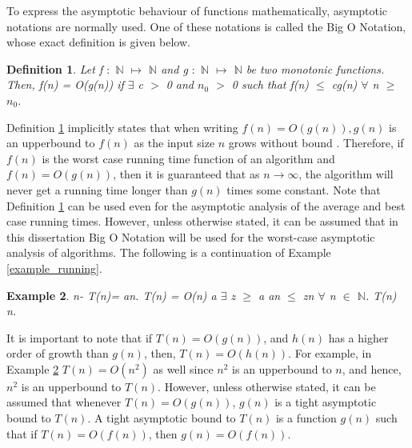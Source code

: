\documentclass[12pt]{article}
\newtheorem{definition}{Definition}[subsection]
\newtheorem{example}[definition]{Example}
\numberwithin{equation}{subsection}
\numberwithin{table}{subsection}
\numberwithin{algorithm}{subsection}
\numberwithin{figure}{subsection}
\begin{document}
To express the asymptotic behaviour of functions mathematically, asymptotic notations are normally used. One of these notations is called the Big O Notation, whose exact definition is given below.
\begin{definition}
\label{bigonotation}
Let f $:$ $\mathbb{N}$ $\mapsto$ $\mathbb{N}$ and g $:$ $\mathbb{N}$ $\mapsto$ $\mathbb{N}$ be two monotonic functions. Then, f(n) = O(g(n)) if $\exists$ c $>$ 0 and $n_0$ $>$ 0 such that f(n) $\leq$ cg(n) $\forall$ n $\geq$ $n_0$.  
\end{definition}
Definition \ref{bigonotation} implicitly states that when writing $\mathit{f(n) = O(g(n)), g(n)}$ is an upperbound to $\mathit{f(n)}$ as the input size $\mathit{n}$ grows without bound \cite{adamchik_2009}. Therefore, if $\mathit{f(n)}$ is the worst case running time function of an algorithm and $\mathit{f(n) = O(g(n))}$, then it is guaranteed that as $\mathit{n \rightarrow \infty}$, the algorithm will never get a running time longer than $\mathit{g(n)}$ times some constant. Note that Definition \ref{bigonotation} can be used even for the asymptotic analysis of the average and best case running times. However, unless otherwise stated, it can be assumed that in this dissertation Big O Notation will be used for the worst-case asymptotic analysis of algorithms. The following is a continuation of Example \ref{example_running}.
\begin{example}
\label{bigonotationexample}
{} n-{} T(n)= an. {} T(n) = O(n) {} a  {} $\exists$ z $\geq$ a {} an $\leq$ zn $\forall$ n $\in$ $\mathbb{N}$. {} T(n) {} n.
\end{example}
It is important to note that if $\mathit{T(n) = O(g(n))}$, and $\mathit{h(n)}$ has a higher order of growth than $\mathit{g(n)}$, then, $\mathit{T(n) = O(h(n))}$. For example, in Example \ref{bigonotationexample} $\mathit{T(n) = O(n^2)}$ as well since $\mathit{n^2}$ is an upperbound to $\mathit{n}$, and hence, $n^2$ is an upperbound to $\mathit{T(n)}$. However, unless otherwise stated, it can be assumed that whenever $\mathit{T(n) = O(g(n))}$, $\mathit{g(n)}$ is a tight asymptotic bound to $\mathit{T(n)}$. A tight asymptotic bound to $\mathit{T(n)}$ is a function $\mathit{g(n)}$ such that if $\mathit{T(n)=O(f(n))}$, then $\mathit{g(n)=O(f(n))}$.\\\\
\end{document}
